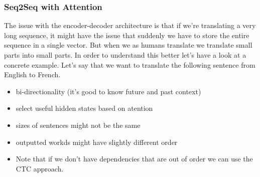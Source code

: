 \documentclass[a2paper,8pt]{extarticle}
\renewcommand{\vec}[1]{\mathbf{#1}}
\newcommand{\vx}{\vec{x}}
\begin{document}
\begin{landscape}
\begin{multicols*}{7}
\subsubsection{Seq2Seq with Attention}

The issue with the encoder-decoder architecture is that if we're translating a
very long sequence, it might have the issue that suddenly we have to store the
entire sequence in a single vector. But when we as humans translate we translate
small parts into small parts. In order to understand this better let's have a
look at a concrete example. Let's say that we want to translate the following
sentence from English to French.
\begin{itemize}
  \item bi-directionality (it's good to know future and past context)
  \item select useful hidden states based on atention
  \item sizes of sentences might not be the same
  \item outputted workds might have slightly different order
  \item Note that if we don't have dependencies that are out of order we can use
  the CTC approach.
\end{itemize}

\end{multicols*}
\end{landscape}
\end{document}
